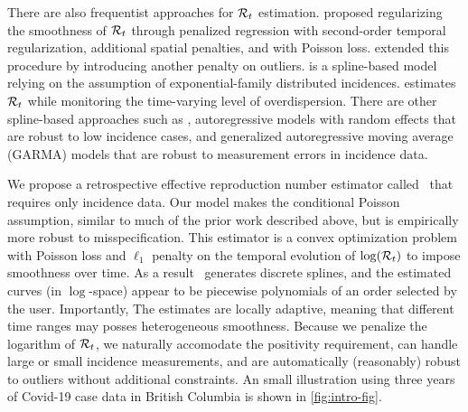 There are also frequentist approaches for $\mathcal{R}_t$ estimation.
\citet{abry2020spatial} proposed regularizing the smoothness of $\mathcal{R}_t$
through penalized
regression with second-order temporal regularization, additional spatial
penalties, and with Poisson loss. \citet{pascal2022nonsmooth}
extended this procedure by introducing another penalty on outliers.
%
\cite{pircal2023spline} is a spline-based model relying on the assumption of exponential-family distributed incidences. %
\cite{ho2023accounting} estimates $\mathcal{R}_t$ while monitoring the time-varying
level of overdispersion. 
%
There are other spline-based approaches such as
\cite{azmon2014estimation,gressani2021approximate,pircalabelu2023spline},
autoregressive models with random effects \citep{jin2023epimix} that are robust
to low incidence cases, and generalized autoregressive moving average (GARMA)
models \citep{hettinger2023estimating} that are robust to measurement errors in
incidence data. 
%


We propose a retrospective effective reproduction number estimator
called \RtEstim\ that requires only incidence data. Our model makes the
conditional Poisson assumption, similar to much of the prior work described
above, but is empirically more robust to misspecification. This estimator is a
convex optimization problem with Poisson loss and $\ell_1$ penalty on the
temporal evolution of $\log(\mathcal{R}_t)$ to impose smoothness over time. 
As a result \RtEstim\ generates discrete splines, and the estimated curves (in
$\log$-space) appear to be piecewise polynomials of an order selected by the
user. Importantly, The estimates are locally adaptive, meaning that different
time ranges may posses heterogeneous smoothness. Because we penalize the
logarithm of $\mathcal{R}_t$, we naturally accomodate the positivity requirement, can
handle large or small incidence measurements, and are automatically (reasonably)
robust to outliers without additional constraints. An small illustration using
three years of Covid-19 case data in British Columbia is shown in \autoref{fig:intro-fig}.

